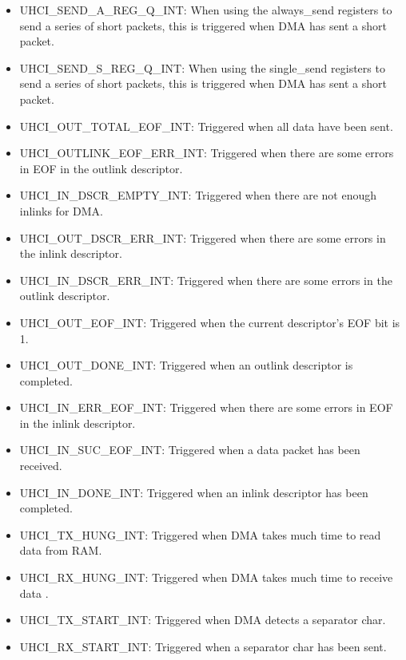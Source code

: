 \documentclass[main\_\_EN.tex]{subfiles}
\begin{document}
\begin{itemize}
\item \label{int:UHCISENDAREGQINT}UHCI\_SEND\_A\_REG\_Q\_INT: When using the always\_send registers to send a series of short packets, this is triggered when DMA has sent a short packet.
\item \label{int:UHCISENDSREGQINT}UHCI\_SEND\_S\_REG\_Q\_INT: When using the single\_send registers to send a series of short packets, this is triggered when DMA has sent a short packet.
\item \label{int:UHCIOUTTOTALEOFINT}UHCI\_OUT\_TOTAL\_EOF\_INT: Triggered when all data have been sent.
\item \label{int:UHCIOUTLINKEOFERRINT}UHCI\_OUTLINK\_EOF\_ERR\_INT: Triggered when there are some errors in EOF in the outlink descriptor.
\item \label{int:UHCIINDSCREMPTYINT}UHCI\_IN\_DSCR\_EMPTY\_INT: Triggered when there are not enough inlinks for DMA.
\item \label{int:UHCIOUTDSCRERRINT}UHCI\_OUT\_DSCR\_ERR\_INT: Triggered when there are some errors in the inlink descriptor.
\item \label{int:UHCIINDSCRERRINT}UHCI\_IN\_DSCR\_ERR\_INT: Triggered when there are some errors in the outlink descriptor.
\item \label{int:UHCIOUTEOFINT}UHCI\_OUT\_EOF\_INT: Triggered when the current descriptor's EOF bit is 1.
\item \label{int:UHCIOUTDONEINT}UHCI\_OUT\_DONE\_INT: Triggered when an outlink descriptor is completed.
\item \label{int:UHCIINERREOFINT}UHCI\_IN\_ERR\_EOF\_INT: Triggered when there are some errors in EOF in the inlink descriptor.
\item \label{int:UHCIINSUCEOFINT}UHCI\_IN\_SUC\_EOF\_INT: Triggered when a data packet has been received.
\item \label{int:UHCIINDONEINT}UHCI\_IN\_DONE\_INT: Triggered when an inlink descriptor has been completed.
\item \label{int:UHCITXHUNGINT}UHCI\_TX\_HUNG\_INT: Triggered when DMA takes much time to read data from RAM.
\item \label{int:UHCIRXHUNGINT}UHCI\_RX\_HUNG\_INT: Triggered when DMA takes much time to receive data .
\item \label{int:UHCITXSTARTINT}UHCI\_TX\_START\_INT: Triggered when DMA detects a separator char.
\item \label{int:UHCIRXSTARTINT}UHCI\_RX\_START\_INT: Triggered when a separator char has been sent.
\end{itemize}
\end{document}
